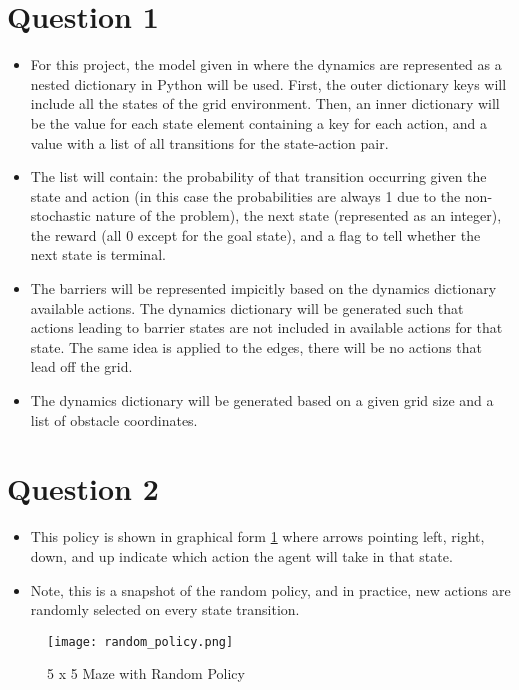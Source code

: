 \documentclass[letterpaper]{article} %
\begin{document}
\section{Question 1}
	\begin{itemize}
	    \item For this project, the model given in \cite{Morales2020GrokkingDL} where the dynamics are represented as a nested dictionary in Python will be used. First, the outer dictionary keys will include all the states of the grid environment. Then, an inner dictionary will be the value for each state element containing a key for each action, and a value with a list of all transitions for the state-action pair.
	    \item The list will contain: the probability of that transition occurring given the state and action (in this case the probabilities are always 1 due to the non-stochastic nature of the problem), the next state (represented as an integer), the reward (all 0 except for the goal state), and a flag to tell whether the next state is terminal.
	    \item The barriers will be represented impicitly based on the dynamics dictionary available actions. The dynamics dictionary will be generated such that actions leading to barrier states are not included in available actions for that state. The same idea is applied to the edges, there will be no actions that lead off the grid.
	    \item The dynamics dictionary will be generated based on a given grid size and a list of obstacle coordinates.
	\end{itemize}

\section{Question 2}
	\begin{itemize}
	    \item This policy is shown in graphical form \ref{fig:random_policy} where arrows pointing left, right, down, and up indicate which action the agent will take in that state.
	    \item Note, this is a snapshot of the random policy, and in practice, new actions are randomly selected on every state transition.
	\end{itemize}

	\begin{figure}[htbp]
	  \centering
	  \texttt{[image: random\_policy.png]}
	  \caption{5 x 5 Maze with Random Policy}
	  \label{fig:random_policy}
	\end{figure}
\end{document}
